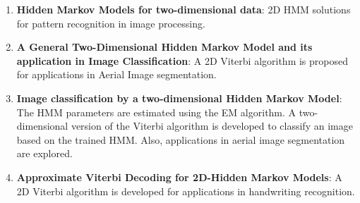 \documentclass[12pt, draftcls, onecolumn]{IEEEtran}
\begin{document}
\begin{enumerate}
    \item \textbf{Hidden Markov Models for two-dimensional data}: 2D HMM solutions for pattern recognition in image processing.
    \item \textbf{A General Two-Dimensional Hidden Markov Model and its application in Image Classification}: A 2D Viterbi algorithm is proposed for applications in Aerial Image segmentation.
    \item \textbf{Image classification by a two-dimensional Hidden Markov Model}: The HMM parameters are estimated using the EM algorithm. A two-dimensional version of the Viterbi algorithm is developed to classify an image based on the trained HMM. Also, applications in aerial image segmentation are explored.
    \item \textbf{Approximate Viterbi Decoding for 2D-Hidden Markov Models}: A 2D Viterbi algorithm is developed for applications in handwriting recognition.
\end{enumerate}
\end{document}
